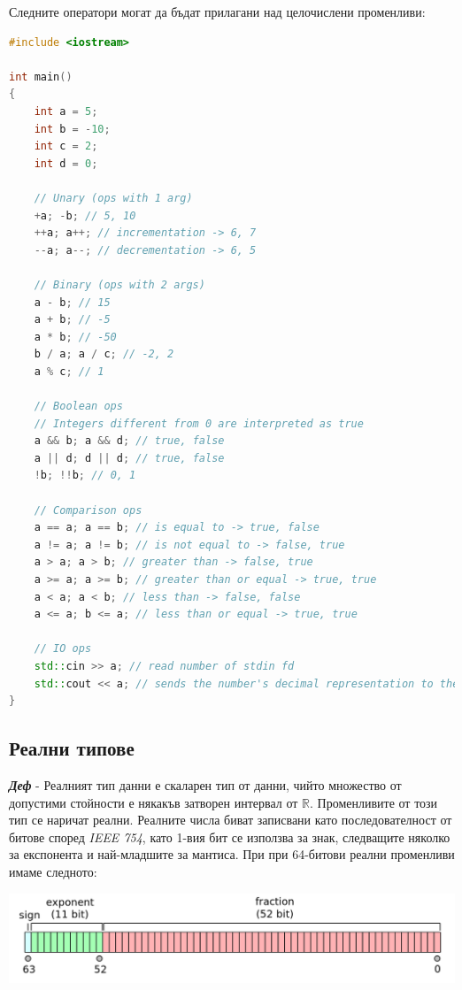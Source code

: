 \documentclass[fleqn,12pt]{article}
\begin{document}
\begin{flushleft}
Следните оператори могат да бъдат прилагани над целочислени променливи:

\begin{lstlisting}[language=C++, caption=Integer operators]
#include <iostream>

int main() 
{
    int a = 5;
    int b = -10;
    int c = 2;
    int d = 0;

    // Unary (ops with 1 arg)
    +a; -b; // 5, 10
    ++a; a++; // incrementation -> 6, 7
    --a; a--; // decrementation -> 6, 5

    // Binary (ops with 2 args)
    a - b; // 15
    a + b; // -5
    a * b; // -50
    b / a; a / c; // -2, 2
    a % c; // 1

    // Boolean ops
    // Integers different from 0 are interpreted as true
    a && b; a && d; // true, false
    a || d; d || d; // true, false
    !b; !!b; // 0, 1

    // Comparison ops
    a == a; a == b; // is equal to -> true, false
    a != a; a != b; // is not equal to -> false, true
    a > a; a > b; // greater than -> false, true
    a >= a; a >= b; // greater than or equal -> true, true
    a < a; a < b; // less than -> false, false
    a <= a; b <= a; // less than or equal -> true, true

    // IO ops
    std::cin >> a; // read number of stdin fd
    std::cout << a; // sends the number's decimal representation to the stdout fd
}
\end{lstlisting}

\subsection{Реални типове}

\textit{\textbf{Деф}} - Реалният тип данни е скаларен тип от данни, чийто множество от допустими стойности е някакъв затворен интервал от $\mathbb{R}$.
Променливите от този тип се наричат реални.
Реалните числа биват записвани като последователност от битове според \textit{IEEE 754}, като 1-вия бит се използва за знак, следващите няколко за експонента и най-младшите за мантиса.
При при 64-битови реални променливи имаме следното:

\includegraphics[width=\textwidth]{floating_point_num.png}


\end{flushleft}
\end{document}
